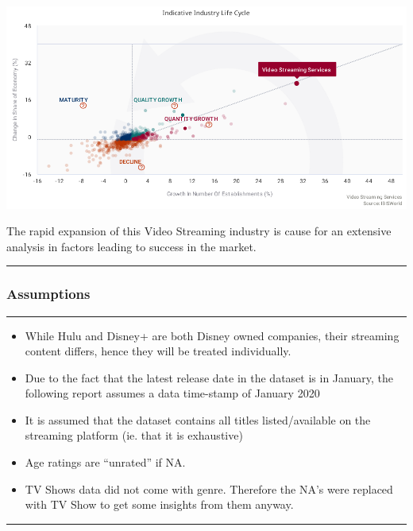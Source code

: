 \documentclass[
]{article}
\providecommand{\tightlist}{%
  \setlength{\itemsep}{0pt}\setlength{\parskip}{0pt}}
\begin{document}
\includegraphics{Video_streaming_services_ibis.png}

The rapid expansion of this Video Streaming industry is cause for an
extensive analysis in factors leading to success in the market.

\begin{center}\rule{0.5\linewidth}{0.5pt}\end{center}

\hypertarget{assumptions}{%
\subsubsection{Assumptions}\label{assumptions}}

\begin{center}\rule{0.5\linewidth}{0.5pt}\end{center}

\begin{itemize}
\tightlist
\item
  While Hulu and Disney+ are both Disney owned companies, their
  streaming content differs, hence they will be treated individually.
\item
  Due to the fact that the latest release date in the dataset is in
  January, the following report assumes a data time-stamp of January
  2020
\item
  It is assumed that the dataset contains all titles listed/available on
  the streaming platform (ie. that it is exhaustive)
\item
  Age ratings are ``unrated'' if NA.
\item
  TV Shows data did not come with genre. Therefore the NA's were
  replaced with TV Show to get some insights from them anyway.
\end{itemize}

\begin{center}\rule{0.5\linewidth}{0.5pt}\end{center}
\end{document}
